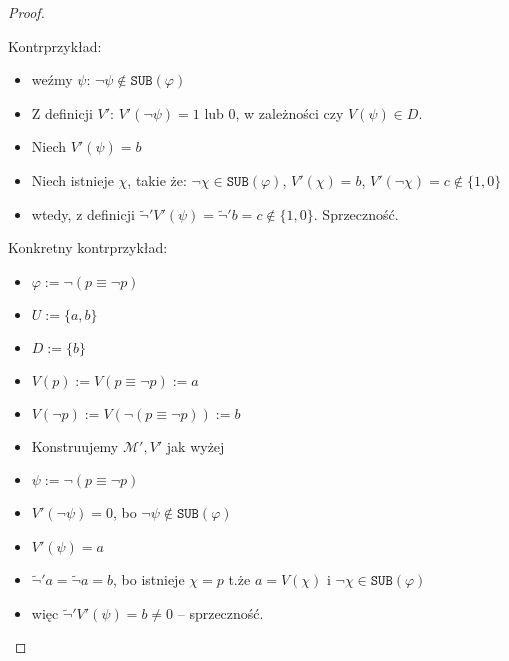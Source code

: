 \documentclass{article}
\theoremstyle{definition}
\theoremstyle{definition}
\theoremstyle{definition}
\newcommand*{\id}{\equiv}
\newcommand*{\SUB}{\texttt{SUB}}
\newcommand{\M}{\mathcal{M}\xspace}
\begin{document}
\begin{proof}
\begin{itemize}
\begin{enumerate}
                          {\color{red} Kontrprzykład:
                              \begin{itemize}
                                  \item weźmy $\psi$: $\lnot \psi \not \in \SUB(\varphi)$
                                  \item Z definicji $V'$: $V'(\lnot \psi) = 1 $ lub $0$, w zależności czy $V(\psi) \in
                                            D$.
                                  \item Niech $V'(\psi) = b$
                                  \item Niech istnieje $\chi$, takie że: $\lnot \chi \in \SUB(\varphi)$, $V'(\chi) =
                                            b$, $V'(\lnot \chi) = c \not \in \{1, 0\}$
                                  \item wtedy, z definicji $\tilde{\lnot}'V'(\psi) = \tilde{\lnot}'b = c \not \in \{1,
                                            0\}.$ Sprzeczność.
                              \end{itemize}

                              Konkretny kontrprzykład:
                              \begin{itemize}
                                  \item $\varphi := \lnot(p \id \lnot p)$
                                  \item $U := \{a, b\}$
                                  \item $D := \{b\}$
                                  \item $V(p) := V(p \id \lnot p) := a$
                                  \item $V(\lnot p) := V(\lnot(p \id \lnot p)) := b$
                                  \item Konstruujemy $\M',V'$ jak wyżej
                                  \item $\psi := \lnot(p \id \lnot p)$
                                  \item $V'(\lnot \psi) = 0$, bo $\lnot \psi \not \in \SUB(\varphi)$
                                  \item $V'(\psi) = a$
                                  \item $\tilde{\lnot}'a = \tilde{\lnot}a = b$, bo istnieje $\chi = p$ t.że $a=V(\chi)$ i $\lnot \chi \in \SUB(\varphi)$
                                  \item więc $\tilde{\lnot}'V'(\psi) = b \not = 0$ -- sprzeczność.
                              \end{itemize}

}
\end{enumerate}
\end{itemize}
\end{proof}
\end{document}
